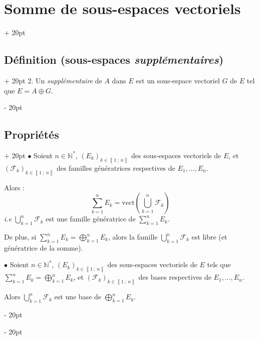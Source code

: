 \documentclass[a4paper, 12pt, twoside]{article}
\newcommand{\N}{\mathbb{N}} %
\newcommand{\nset}[2]{\left\llbracket #1\ ;\ #2 \right\rrbracket}
\newcommand{\lr}[1]{\left( #1 \right)}
\newcommand{\ind}[1][20pt]{\advance\leftskip + #1}
\newcommand{\deind}[1][20pt]{\advance\leftskip - #1}
\newenvironment{indt}[2][20pt]{#2 \par \ind[#1]}{\par \deind} %
\begin{document}
\begin{indt}{\section{Somme de sous-espaces vectoriels}}
\begin{indt}{\subsection{Définition (sous-espaces \textit{supplémentaires})}}
            2. Un \textit{supplémentaire} de $A$ dans $E$ est un sous-espace vectoriel $G$ de $E$ tel que $E = A \oplus G$.
        \end{indt}
        
        \vspace{12pt}
        
        \begin{indt}{\subsection{Propriétés}}
            $\bullet$ Soient $n \in \N^*$, $(E_k)_{k \in \nset 1 n}$ des sous-espaces vectoriels de $E$, et $(\mathcal F_k)_{k \in \nset 1 n}$ des familles génératrices respectives de $E_1, \ldots, E_n$.
            
            Alors : %
                \[ \sum_{k = 1}^n E_k = \mathrm{vect}\lr{\bigcup_{k = 1}^n \mathcal F_k} \]
            \textit{i.e} $\displaystyle \bigcup_{k = 1}^n \mathcal F_k$ est une famille génératrice de $\displaystyle \sum_{k = 1}^n E_k$.
            
            \vspace{12pt}
            
            De plus, si $\displaystyle \sum_{k = 1}^n E_k = \bigoplus_{k = 1}^n E_k$, alors la famille $\displaystyle \bigcup_{k = 1}^n \mathcal F_k$ est libre (et génératrice de la somme).
            
            
            \vspace{12pt}
            
            $\bullet$ Soient $n \in \N^*$, $(E_k)_{k \in \nset 1 n}$ des sous-espaces vectoriels de $E$ tels que $\displaystyle \sum_{k = 1}^n E_k = \bigoplus_{k = 1}^n E_k$, et $(\mathcal F_k)_{k \in \nset 1 n}$ des bases respectives de $E_1, \ldots, E_n$.
            
            \vspace{6pt}
            
            Alors $\displaystyle \bigcup_{k = 1}^n \mathcal F_k$ est une base de $\displaystyle \bigoplus_{k = 1}^n E_k$.
        \end{indt}
        
    \end{indt}
    
\end{document}
